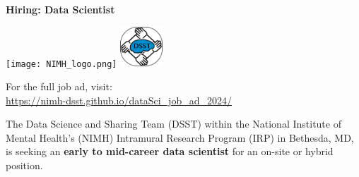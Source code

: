 \documentclass[11pt,letterpaper]{article}
\begin{document}
\begin{minipage}[t]{0.75\textwidth}
    \LARGE\textbf{Hiring: Data Scientist}
    
    \vspace{0.2cm}
    \texttt{[image: NIMH\_logo.png]}
    \hspace{0.5cm}
    \includegraphics[height=1.5cm]{dsst_logo.png}
\end{minipage}%
\begin{minipage}[t]{0.25\textwidth}
    \raggedleft
    \vspace{0.1cm}
    
    \footnotesize For the full job ad, visit:\\
    \url{https://nimh-dsst.github.io/dataSci_job_ad_2024/}
\end{minipage}

\vspace{0.2cm}

\normalsize
The Data Science and Sharing Team (DSST) within the National Institute of Mental Health's (NIMH) Intramural Research Program (IRP) in Bethesda, MD, is seeking an \textbf{early to mid-career data scientist} for an on-site or hybrid position. 
\end{document}
